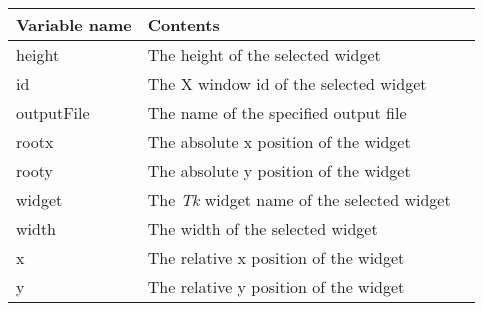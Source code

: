 {\newpage
\clearpage
\samepage \begin{figure}[hbt]
  \centerline{
  \epsfysize=9.5cm
  }
  
  \label{fig:The xfappdef program}
\end{figure}
}

{\newpage
\clearpage
\samepage \begin{figure}[hbt]
  \centerline{
  \epsfysize=8.5cm
  }
  
  \label{fig:The xfhardcopy program}
\end{figure}
}

{\newpage
\clearpage
\samepage \begin{tabular}{|l|l|p{8.5cm}|} \hline
Variable name & Contents\\  \hline
height        & The height of the selected widget\\  \hline
id            & The X window id of the selected widget\\  \hline
outputFile    & The name of the specified output file\\  \hline
rootx         & The absolute x position of the widget\\  \hline
rooty         & The absolute y position of the widget\\  \hline
widget        & The {\em Tk }
 widget name of the selected widget\\  \hline
width         & The width of the selected widget\\  \hline
x             & The relative x position of the widget\\  \hline
y             & The relative y position of the widget\\  \hline
\end{tabular}
}

{\newpage
\clearpage
\samepage \begin{figure}[hbt]
  \centerline{
  \epsfysize=12cm
  }
  
  \label{fig:The xfhelp program}
\end{figure}
}

{\newpage
\clearpage
\samepage \begin{figure}[hbt]
  \centerline{
  \epsfysize=12.5cm
  }
  
  \label{fig:The xfpixmap program}
\end{figure}
}

